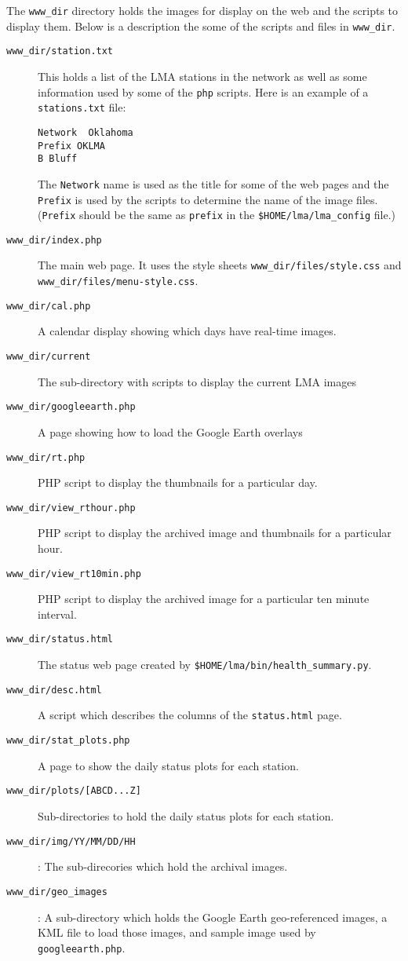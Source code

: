 \documentclass[12pt]{article}
\begin{document}
The \verb+www_dir+ directory holds the images for display on the web and the scripts to display them.  Below is a description the some of the
scripts and files in \verb+www_dir+.

\begin{description}
\item[{\tt www\_dir/station.txt}] This holds a list of the LMA stations in the network as well as some information used by some of the
\verb+php+ scripts.  Here is an example of a \verb+stations.txt+ file:
\begin{verbatim}
Network  Oklahoma
Prefix OKLMA
B Bluff
\end{verbatim}

The \verb+Network+ name is used as the title for some of the web pages and the \verb+Prefix+ is used by the scripts to determine the name of
the image files.  (\verb+Prefix+ should be the same as \verb+prefix+ in the \verb+$HOME/lma/lma_config+ file.)

\item[{\tt www\_dir/index.php}] The main web page.  It uses the style sheets \verb+www_dir/files/style.css+ and
\verb+www_dir/files/menu-style.css+.

\item[{\tt www\_dir/cal.php}] A calendar display showing which days have real-time images.
\item[{\tt www\_dir/current}] The sub-directory with scripts to display the current LMA images
\item[{\tt www\_dir/googleearth.php}] A page showing how to load the Google Earth overlays
\item[{\tt www\_dir/rt.php}] PHP script to display the thumbnails for a particular day.
\item[{\tt www\_dir/view\_rthour.php}] PHP script to display the archived image and thumbnails for a particular hour.
\item[{\tt www\_dir/view\_rt10min.php}] PHP script to display the archived image for a particular ten minute interval.
\item[{\tt www\_dir/status.html}] The status web page created by \verb+$HOME/lma/bin/health_summary.py+.
\item[{\tt www\_dir/desc.html}] A script which describes the columns of the \verb+status.html+ page.
\item[{\tt www\_dir/stat\_plots.php}]  A page to show the daily status plots for each station.
\item[{\tt www\_dir/plots/[ABCD...Z]}]  Sub-directories to hold the daily status plots for each station.
\item[{\tt{www\_dir/img/YY/MM/DD/HH}}]: The sub-direcories which hold the archival images.
\item[{\tt{www\_dir/geo\_images}}]: A sub-directory which holds the Google Earth geo-referenced images, a KML file to load those images, and
sample image used by \verb+googleearth.php+.

\end{description}

 
\end{document}
